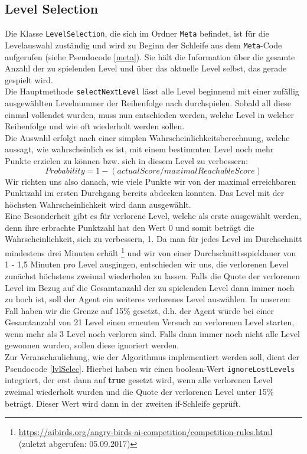 \subsection{Level Selection}
Die Klasse \texttt{LevelSelection}, die sich im Ordner \texttt{Meta} befindet, ist für die Levelauswahl zuständig und wird zu Beginn der Schleife aus dem \texttt{Meta}-Code aufgerufen (siehe Pseudocode \ref{meta}). Sie hält die Information über die gesamte Anzahl der zu spielenden Level und über das aktuelle Level selbst, das gerade gespielt wird. \\ 
Die Hauptmethode \texttt{selectNextLevel} lässt alle Level beginnend mit einer zufällig ausgewählten Levelnummer der Reihenfolge nach durchspielen. Sobald all diese einmal vollendet wurden, muss nun entschieden werden, welche Level in welcher Reihenfolge und wie oft wiederholt werden sollen. \\
Die Auswahl erfolgt nach einer simplen Wahrscheinlichkeitsberechnung, welche aussagt, wie wahrscheinlich es ist, mit einem bestimmten Level noch mehr Punkte erzielen zu können bzw. sich in diesem Level zu verbessern:  \\
$$ Probability = 1 - ( actualScore / maximalReachableScore ) $$
Wir richten uns also danach, wie viele Punkte wir von der maximal erreichbaren Punktzahl im ersten Durchgang bereits abdecken konnten. Das Level mit der höchsten Wahrscheinlichkeit wird dann ausgewählt. \\
Eine Besonderheit gibt es für verlorene Level, welche als erste ausgewählt werden, denn ihre erbrachte Punktzahl hat den Wert 0 und somit beträgt die Wahrscheinlichkeit, sich zu verbessern, 1. Da man für jedes Level im Durchschnitt mindestens drei Minuten erhält \footnote{\url{https://aibirds.org/angry-birds-ai-competition/competition-rules.html} (zuletzt abgerufen: 05.09.2017)} und wir von einer Durchschnittsspieldauer von 1 - 1,5 Minuten pro Level ausgingen, entschieden wir uns, die verlorenen Level zunächst höchstens zweimal wiederholen zu lassen. Falls die Quote der verlorenen Level im Bezug auf die Gesamtanzahl der zu spielenden Level dann immer noch zu hoch ist, soll der Agent ein weiteres verlorenes Level auswählen. In unserem Fall haben wir die Grenze auf 15\% gesetzt, d.h. der Agent würde bei einer Gesamtanzahl von 21 Level einen erneuten Versuch an verlorenen Level starten, wenn mehr als 3 Level noch verloren sind. Falls dann immer noch nicht alle Level gewonnen wurden, sollen diese ignoriert werden. \\ 
Zur Veranschaulichung, wie der Algorithmus implementiert werden soll, dient der Pseudocode \ref{lvlSelec}. Hierbei haben wir einen boolean-Wert \texttt{ignoreLostLevels} integriert, der erst dann auf \textbf{true} gesetzt wird, wenn alle verlorenen Level zweimal wiederholt wurden und die Quote der verlorenen Level unter 15\% beträgt. Dieser Wert wird dann in der zweiten if-Schleife geprüft. \\
